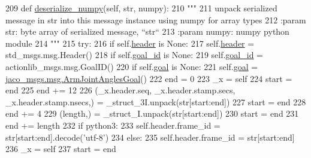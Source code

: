 \begin{DoxyCode}
209   \textcolor{keyword}{def }\hyperlink{classjaco__msgs_1_1msg_1_1__ArmJointAnglesActionGoal_1_1ArmJointAnglesActionGoal_a51d2b141fbda65707aa052f65f8ec37e}{deserialize\_numpy}(self, str, numpy):
210     \textcolor{stringliteral}{"""}
211 \textcolor{stringliteral}{    unpack serialized message in str into this message instance using numpy for array types}
212 \textcolor{stringliteral}{    :param str: byte array of serialized message, ``str``}
213 \textcolor{stringliteral}{    :param numpy: numpy python module}
214 \textcolor{stringliteral}{    """}
215     \textcolor{keywordflow}{try}:
216       \textcolor{keywordflow}{if} self.\hyperlink{classjaco__msgs_1_1msg_1_1__ArmJointAnglesActionGoal_1_1ArmJointAnglesActionGoal_aaea49c5d26e095d3e05e1164e8b78f88}{header} \textcolor{keywordflow}{is} \textcolor{keywordtype}{None}:
217         self.\hyperlink{classjaco__msgs_1_1msg_1_1__ArmJointAnglesActionGoal_1_1ArmJointAnglesActionGoal_aaea49c5d26e095d3e05e1164e8b78f88}{header} = std\_msgs.msg.Header()
218       \textcolor{keywordflow}{if} self.\hyperlink{classjaco__msgs_1_1msg_1_1__ArmJointAnglesActionGoal_1_1ArmJointAnglesActionGoal_a7c8303d67ea7eab4c1eb71988d980183}{goal\_id} \textcolor{keywordflow}{is} \textcolor{keywordtype}{None}:
219         self.\hyperlink{classjaco__msgs_1_1msg_1_1__ArmJointAnglesActionGoal_1_1ArmJointAnglesActionGoal_a7c8303d67ea7eab4c1eb71988d980183}{goal\_id} = actionlib\_msgs.msg.GoalID()
220       \textcolor{keywordflow}{if} self.\hyperlink{classjaco__msgs_1_1msg_1_1__ArmJointAnglesActionGoal_1_1ArmJointAnglesActionGoal_ad21a72cdb415ceec3c8f770f97a2f445}{goal} \textcolor{keywordflow}{is} \textcolor{keywordtype}{None}:
221         self.\hyperlink{classjaco__msgs_1_1msg_1_1__ArmJointAnglesActionGoal_1_1ArmJointAnglesActionGoal_ad21a72cdb415ceec3c8f770f97a2f445}{goal} = \hyperlink{classjaco__msgs_1_1msg_1_1__ArmJointAnglesGoal_1_1ArmJointAnglesGoal}{jaco\_msgs.msg.ArmJointAnglesGoal}()
222       end = 0
223       \_x = self
224       start = end
225       end += 12
226       (\_x.header.seq, \_x.header.stamp.secs, \_x.header.stamp.nsecs,) = \_struct\_3I.unpack(str[start:end])
227       start = end
228       end += 4
229       (length,) = \_struct\_I.unpack(str[start:end])
230       start = end
231       end += length
232       \textcolor{keywordflow}{if} python3:
233         self.header.frame\_id = str[start:end].decode(\textcolor{stringliteral}{'utf-8'})
234       \textcolor{keywordflow}{else}:
235         self.header.frame\_id = str[start:end]
236       \_x = self
237       start = end

\end{DoxyCode}
